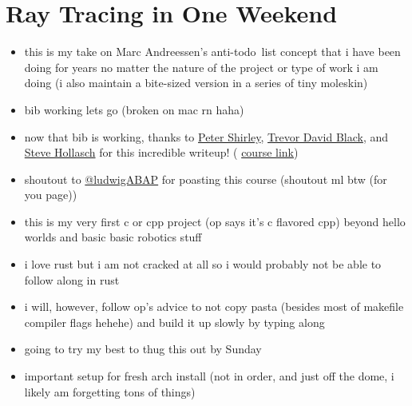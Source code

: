 \clearpage
\section{Ray Tracing in One Weekend}

\begin{itemize}
    \item this is my take on Marc Andreessen's anti-todo\footnotemark\ list
        concept that i have been doing for years no matter the nature of the 
        project or type of work i am doing (i also maintain a bite-sized 
        version in a series of tiny moleskin)
    \item bib working lets go (broken on mac rn haha)
    \item now that bib is working, thanks to 
        \textcolor{blue}{\href{https://github.com/petershirley}{Peter Shirley}},
        \textcolor{blue}{\href{https://github.com/trevordblack}{Trevor David Black}}, and
        \textcolor{blue}{\href{https://github.com/hollasch}{Steve Hollasch}}
        for this incredible writeup! (
        \textcolor{blue}{\href{https://raytracing.github.io/books/RayTracingInOneWeekend.html}{course
        link}})
    \item shoutout to 
        \textcolor{blue}{\href{https://x.com/ludwigABAP}{@ludwigABAP}}
        for poasting this course (shoutout ml btw (for you page))
    \item this is my very first c or cpp project (op says it's c flavored cpp) 
        beyond hello worlds and basic basic robotics stuff
    \item i love rust but i am not cracked at all so i would probably not be
        able to follow along in rust
    \item i will, however, follow op's advice to not copy pasta (besides most of 
        makefile compiler flags hehehe) and build it up slowly by typing along
    \item going to try my best to thug this out by Sunday
    \item important setup for fresh arch install (not in order, and just off the
        dome, i likely am forgetting tons of things)

\end{itemize}

